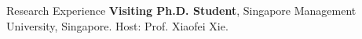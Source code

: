 \begin{rubric}{Research Experience}
\entry*[Present]%
	\textbf{Visiting Ph.D. Student}, Singapore Management University, Singapore. Host: Prof. Xiaofei Xie.
\end{rubric}
